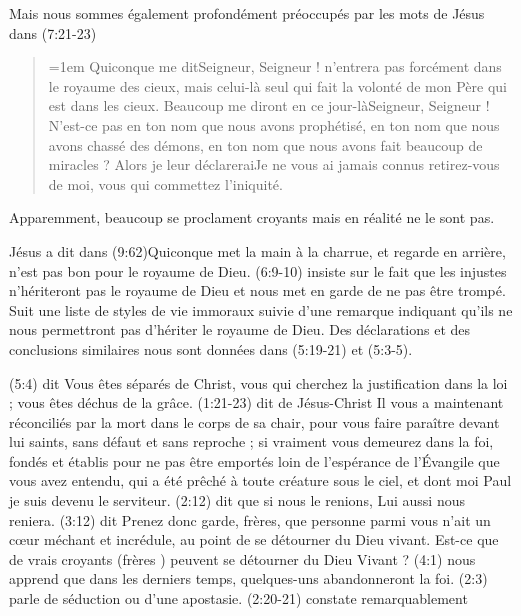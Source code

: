 Mais nous sommes également profondément préoccupés par les mots de Jésus dans (7:21-23)\frcolon

\begin{quote}
\begin{digestpar}{}
\begin{pocketpar}{\emergencystretch=1em}
 \Og Quiconque me dit\frcolon Seigneur,
 Seigneur ! n'entrera pas forcément
 dans le royaume des cieux, mais celui-là seul qui fait la volonté de mon Père
 qui est dans les cieux. Beaucoup me diront en ce jour-là\frcolon Seigneur, Seigneur !
 N'est-ce pas en ton nom que nous avons prophétisé, en ton nom que nous avons
 chassé des démons, en ton nom que nous avons fait beaucoup de miracles ?
 Alors je leur déclarerai\frcolon Je ne vous ai jamais connus retirez-vous de moi,
 vous qui commettez l'iniquité. \Fg{}
\end{pocketpar}
\end{digestpar}
\end{quote}

\begin{pocketpar}{}
Apparemment, beaucoup se pro\-cla\-ment croyants mais en réalité ne le sont pas.
\end{pocketpar}

Jésus a dit dans (9:62)\frcolon \Og Quiconque met la main à la charrue,
 et regarde en arrière, n'est pas bon pour le royaume de Dieu. \Fg{}
 (6:9-10) insiste sur le fait que
 \Og les injustes n'hériteront pas le royaume de Dieu \Fg{}
 et nous met en garde de ne pas être trompé.
 Suit une liste de styles de vie immoraux suivie d'une remarque
 indiquant qu'ils ne nous permettront pas d'hériter le royaume de Dieu.
 Des déclarations et des conclusions similaires nous sont données
 dans (5:19-21) et (5:3-5).

(5:4) dit\frcolon
 \Og Vous êtes séparés de Christ, vous qui cherchez la justification
 dans la loi ; vous êtes déchus de la grâce. \Fg{}
 (1:21-23) dit de Jésus-Christ\frcolon
 \Og Il vous a maintenant réconciliés par la mort dans le corps de sa chair,
 pour vous faire paraître devant lui saints, sans défaut et sans reproche ;
 si vraiment vous demeurez dans la foi, fondés et établis pour ne pas être
 emportés loin de l'espérance de l'Évangile que vous avez entendu,
 qui a été prêché à toute créature sous le ciel, et dont moi Paul
 je suis devenu le serviteur. \Fg{}
 (2:12) dit que \Og si nous le renions, Lui aussi nous reniera. \Fg{}
 (3:12) dit\frcolon
 \Og Prenez donc garde, frères, que personne parmi vous n'ait un cœur méchant
 et incrédule, au point de se détourner du Dieu vivant. \Fg{}
 Est-ce que de vrais croyants (\Og frères \Fg{}) peuvent se détourner du Dieu Vivant ?
 (4:1) nous apprend que \Og dans les derniers temps,
 quelques-uns abandonneront la foi. \Fg{}
 (2:3) parle de \Og séduction \Fg{} ou d'une apostasie.
 (2:20-21) constate remarquablement\frcolon

